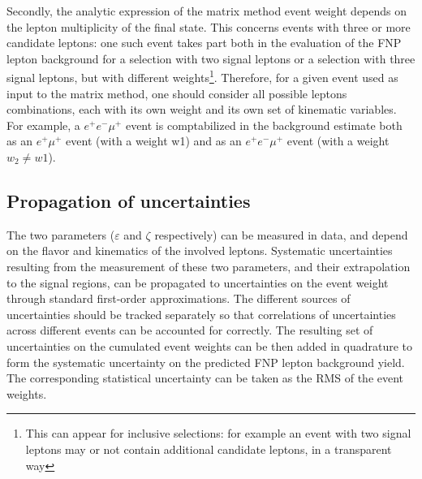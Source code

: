 Secondly, the analytic expression of the matrix method event weight depends on the lepton multiplicity of the final state. This concerns events with three or more candidate leptons: one such event takes part both in the evaluation of the FNP lepton background for a selection with two signal leptons or a selection with three signal leptons, but with different weights\footnote{This can appear for inclusive selections: for example an event with two signal leptons may or not contain additional candidate leptons, in a transparent way}. Therefore, for a given event used as input to the matrix method, one should consider all possible leptons combinations, each with its own weight and its own set of kinematic variables. For example, a $e^+e^-\mu^+$ event is comptabilized in the background estimate both as an $e^+\mu^+$ event (with a weight w1) and as an $e^+e^-\mu^+$ event (with a weight $w_2\neq w1$).  

\subsection{Propagation of uncertainties}

The two parameters ($\varepsilon$ and $\zeta$ respectively) can be measured in data, and depend on the flavor and kinematics of the involved leptons.  Systematic uncertainties resulting from the measurement of these two parameters, and their extrapolation to the signal regions, can be propagated to uncertainties on the event weight through standard first-order approximations. The different sources of uncertainties should be tracked separately so that correlations of uncertainties across different events can be accounted for correctly. The resulting set of uncertainties on the cumulated event weights can be then added in quadrature to form the systematic uncertainty on the predicted FNP lepton background yield. The corresponding statistical uncertainty can be taken as the RMS of the event weights.

